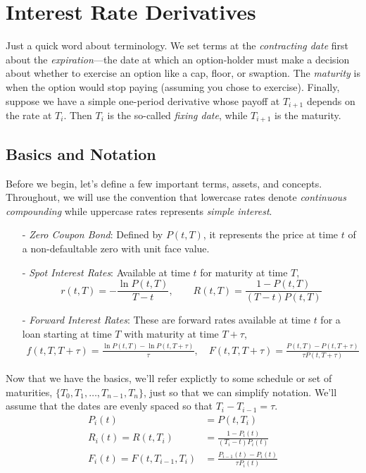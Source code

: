 \documentclass[a4paper,12pt]{scrartcl}
\begin{document}
\newpage
\section{Interest Rate Derivatives}

Just a quick word about terminology. We set terms at the 
\emph{contracting date} first about 
the \emph{expiration}---the date at which an option-holder must  
make a decision about whether to exercise an option like 
a cap, floor, or swaption. The \emph{maturity}
is when the option would stop paying (assuming you chose to exercise).
Finally, suppose we have a simple one-period 
derivative whose payoff at $T_{i+1}$ depends
on the rate at $T_i$. Then $T_i$ is the so-called \emph{fixing date},
while $T_{i+1}$ is the maturity.



\subsection{Basics and Notation}
Before we begin, let's define a few important terms, assets, 
and concepts.
Throughout, we will use the convention that lowercase rates
denote \emph{continuous compounding} while uppercase rates represents
\emph{simple interest}.  
\begin{itemize}
   \item[-] {\sl Zero Coupon Bond}: Defined by $P(t,T)$, 
      it represents the 
      price at time $t$ of a non-defaultable zero with unit face value.
   \item[-] {\sl Spot Interest Rates}: Available at time $t$ for maturity
      at time $T$,
      \[ r(t,T) = -\frac{\ln P(t,T)}{T-t}, \qquad  
	 R(t,T) = \frac{1-P(t,T)}{(T-t)P(t,T)}\]
   \item[-] 
      {\sl Forward Interest Rates}: These are forward rates available
      at time $t$ for a loan starting at time $T$ with maturity 
      at time $T+\tau$,
      \begin{align*}
	 f(t,T,T+\tau) = \frac{\ln P(t,T) - \ln P(t,T+\tau)}{\tau},
	 \quad F(t,T,T+\tau) = \frac{P(t,T) - P(t,T+\tau)}{\tau
	 P(t,T+\tau)} 
      \end{align*}
\end{itemize}
Now that we have the basics, we'll refer explictly to some schedule or
set of maturities, $\{T_0, T_1, \ldots, T_{n-1}, T_n\}$, just so that
we can simplify notation. We'll assume that the dates are evenly 
spaced so that $T_{i} - T_{i-1}= \tau$.
\begin{align*}
   P_i(t) &= P(t,T_i) \\
   R_i(t) = R(t,T_i) &= \frac{1 - P_i(t)}{(T_i-t)P_i(t)} \\
   F_i(t) = F(t,T_{i-1},T_i)&=\frac{P_{i-1}(t)-P_i(t)}{\tau P_i(t)}\\
\end{align*}
\end{document}
